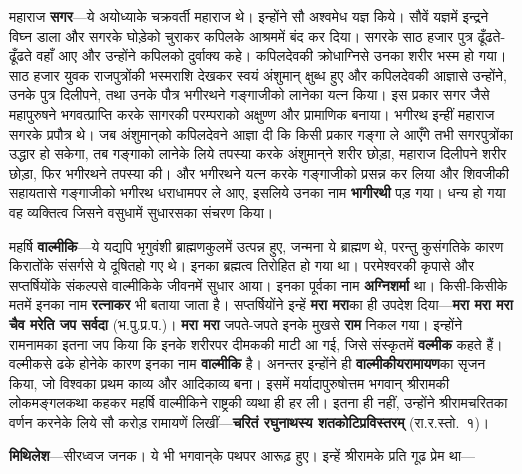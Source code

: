 \begin{sloppypar}\justifying{}
महाराज \textbf{सगर}—ये अयोध्याके चक्रवर्ती महाराज थे। इन्होंने सौ अश्वमेध यज्ञ किये। सौवें यज्ञमें इन्द्रने विघ्न डाला और सगरके घोड़ेको चुराकर कपिलके आश्रममें बंद कर दिया। सगरके साठ हजार पुत्र ढूँढते-ढूँढते वहाँ आए और उन्होंने कपिलको दुर्वाक्य कहे। कपिलदेवकी क्रोधाग्निसे उनका शरीर भस्म हो गया। साठ हजार युवक राजपुत्रोंकी भस्मराशि देखकर स्वयं अंशुमान् क्षुब्ध हुए और कपिलदेवकी आज्ञासे उन्होंने, उनके पुत्र दिलीपने, तथा उनके पौत्र भगीरथने गङ्गाजीको लानेका यत्न किया। इस प्रकार सगर जैसे महापुरुषने भगवत्प्राप्ति करके सागरकी परम्पराको अक्षुण्ण और प्रामाणिक बनाया। भगीरथ इन्हीं महाराज सगरके प्रपौत्र थे। जब अंशुमान्‌को कपिलदेवने आज्ञा दी कि किसी प्रकार गङ्गा ले आएँगे तभी सगर\-पुत्रोंका उद्धार हो सकेगा, तब गङ्गाको लानेके लिये तपस्या करके अंशुमान्‌ने शरीर छोड़ा, महाराज दिलीपने शरीर छोड़ा, फिर भगीरथने तपस्या की। और भगीरथने यत्न करके गङ्गाजीको प्रसन्न कर लिया और शिवजीकी सहायतासे गङ्गाजीको भगीरथ धराधामपर ले आए, इसलिये उनका नाम \textbf{भागीरथी} पड़ गया। धन्य हो गया वह व्यक्तित्व जिसने वसुधामें सुधारसका संचरण किया।
\end{sloppypar}
\begin{sloppypar}\justifying{}
महर्षि \textbf{वाल्मीकि}—ये यद्यपि भृगुवंशी ब्राह्मणकुलमें उत्पन्न हुए, जन्मना ये ब्राह्मण थे, परन्तु कुसंगतिके कारण किरातोंके संसर्गसे ये दूषितहो गए थे। इनका ब्रह्मत्व तिरोहित हो गया था। परमेश्वरकी कृपासे और सप्तर्षियोंके संकल्पसे वाल्मीकिके जीवनमें सुधार आया। इनका पूर्वका नाम \textbf{अग्निशर्मा} था। किसी-किसीके मतमें इनका नाम \textbf{रत्नाकर} भी बताया जाता है। सप्तर्षियोंने इन्हें \textbf{मरा मरा}का ही उपदेश दिया—\textbf{मरा मरा मरा चैव मरेति जप सर्वदा} (भ.पु.प्र.प.)। \textbf{मरा मरा} जपते-जपते इनके मुखसे \textbf{राम} निकल गया। इन्होंने रामनामका इतना जप किया कि इनके शरीरपर दीमककी माटी आ गई, जिसे संस्कृतमें \textbf{वल्मीक} कहते हैं। वल्मीकसे ढके होनेके कारण इनका नाम \textbf{वाल्मीकि} है। अनन्तर इन्होंने ही \textbf{वाल्मीकीय\-रामायण}का सृजन किया, जो विश्वका प्रथम काव्य और आदिकाव्य बना। इसमें मर्यादा\-पुरुषोत्तम भगवान् श्रीरामकी लोकमङ्गल\-कथा कहकर महर्षि वाल्मीकिने राष्ट्रकी व्यथा ही हर ली। इतना ही नहीं, उन्होंने श्रीरामचरितका वर्णन करनेके लिये सौ करोड़ रामायणें लिखीं—\textbf{चरितं रघुनाथस्य शतकोटिप्रविस्तरम्} (रा.र.स्तो.~१)।
\end{sloppypar}
\begin{sloppypar}\justifying{}
\textbf{मिथिलेश}—सीरध्वज जनक। ये भी भगवान्‌के पथपर आरूढ़ हुए। इन्हें श्रीरामके प्रति गूढ प्रेम था—
\end{sloppypar}

